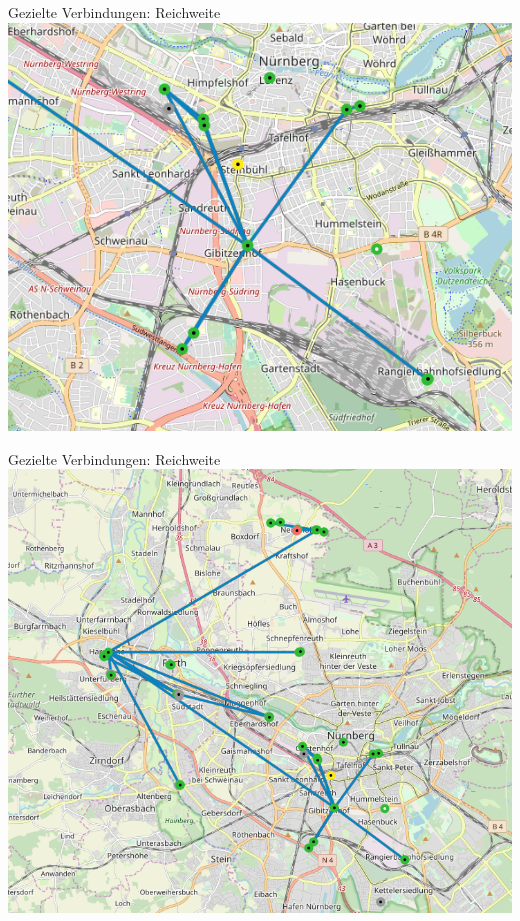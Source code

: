 \documentclass{beamer}
\begin{document}
	\begin{frame}[standout]{Gezielte Verbindungen: Reichweite}
		\includegraphics[height=0.9\textheight]{media/rf_nbg.png}
	\end{frame}
	\begin{frame}[standout]{Gezielte Verbindungen: Reichweite}
		\includegraphics[height=0.9\textheight]{media/rf_nbgfue.png}
	\end{frame}
\end{document}
